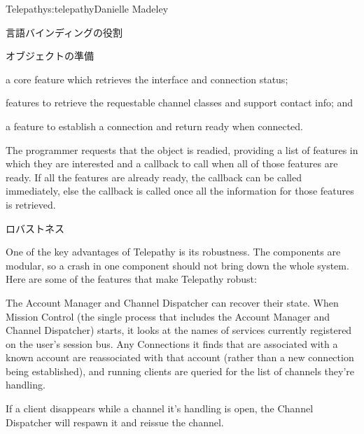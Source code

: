 \begin{aosachapter}{Telepathy}{s:telepathy}{Danielle Madeley}
\begin{aosasect1}{言語バインディングの役割}
\begin{aosasect2}{オブジェクトの準備}
\begin{aosaitemize}

  \item a core feature which retrieves the interface and connection
    status;

  \item features to retrieve the requestable channel classes and
    support contact info; and

  \item a feature to establish a connection and return ready when
    connected.

\end{aosaitemize}

The programmer requests that the object is readied, providing a list
of features in which they are interested and a callback to call when
all of those features are ready. If all the features are already
ready, the callback can be called immediately, else the callback is
called once all the information for those features is retrieved.

\end{aosasect2}

\end{aosasect1}

\begin{aosasect1}{ロバストネス}

One of the key advantages of Telepathy is its robustness. The
components are modular, so a crash in one component should not bring
down the whole system.  Here are some of the features that make
Telepathy robust:

\begin{aosaitemize}

  \item The Account Manager and Channel Dispatcher can recover their
    state.  When Mission Control (the single process that includes the
    Account Manager and Channel Dispatcher) starts, it looks at the
    names of services currently registered on the user's session bus.
    Any Connections it finds that are associated with a known account
    are reassociated with that account (rather than a new connection
    being established), and running clients are queried for the list
    of channels they're handling.

  \item If a client disappears while a channel it's handling is open,
    the Channel Dispatcher will respawn it and reissue the channel.


\end{aosaitemize}
\end{aosasect1}
\end{aosachapter}
